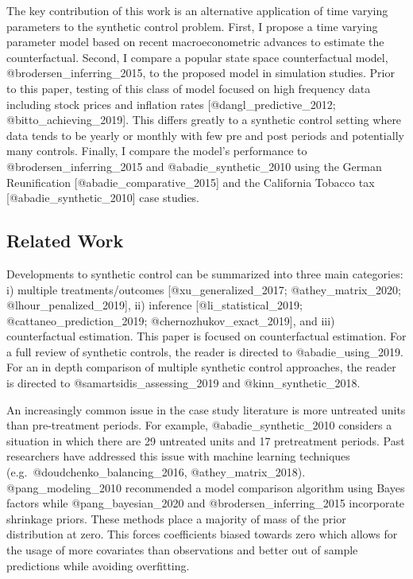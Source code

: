 \documentclass[
]{article}
\begin{document}
The key contribution of this work is an alternative application of time
varying parameters to the synthetic control problem. First, I propose a
time varying parameter model based on recent macroeconometric advances
to estimate the counterfactual. Second, I compare a popular state space
counterfactual model, @brodersen\_inferring\_2015, to the proposed model
in simulation studies. Prior to this paper, testing of this class of
model focused on high frequency data including stock prices and
inflation rates {[}@dangl\_predictive\_2012; @bitto\_achieving\_2019{]}.
This differs greatly to a synthetic control setting where data tends to
be yearly or monthly with few pre and post periods and potentially many
controls. Finally, I compare the model's performance to
@brodersen\_inferring\_2015 and @abadie\_synthetic\_2010 using the
German Reunification {[}@abadie\_comparative\_2015{]} and the California
Tobacco tax {[}@abadie\_synthetic\_2010{]} case studies.

\hypertarget{related-work}{%
\subsection{Related Work}\label{related-work}}

Developments to synthetic control can be summarized into three main
categories: i) multiple treatments/outcomes {[}@xu\_generalized\_2017;
@athey\_matrix\_2020; @lhour\_penalized\_2019{]}, ii) inference
{[}@li\_statistical\_2019; @cattaneo\_prediction\_2019;
@chernozhukov\_exact\_2019{]}, and iii) counterfactual estimation. This
paper is focused on counterfactual estimation. For a full review of
synthetic controls, the reader is directed to @abadie\_using\_2019. For
an in depth comparison of multiple synthetic control approaches, the
reader is directed to @samartsidis\_assessing\_2019 and
@kinn\_synthetic\_2018.

An increasingly common issue in the case study literature is more
untreated units than pre-treatment periods. For example,
@abadie\_synthetic\_2010 considers a situation in which there are 29
untreated units and 17 pretreatment periods. Past researchers have
addressed this issue with machine learning techniques
(e.g.~@doudchenko\_balancing\_2016, @athey\_matrix\_2018).
@pang\_modeling\_2010 recommended a model comparison algorithm using
Bayes factors while @pang\_bayesian\_2020 and
@brodersen\_inferring\_2015 incorporate shrinkage priors. These methods
place a majority of mass of the prior distribution at zero. This forces
coefficients biased towards zero which allows for the usage of more
covariates than observations and better out of sample predictions while
avoiding overfitting.
\end{document}
